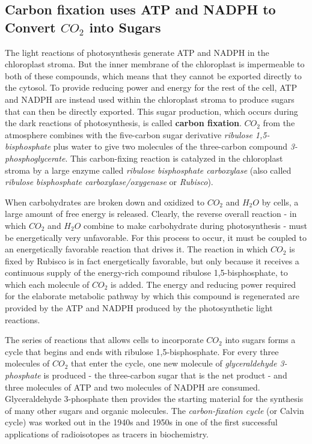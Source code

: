 \subsection{Carbon fixation uses ATP and NADPH to Convert $CO_2$ into Sugars}

The light reactions of photosynthesis generate ATP and NADPH in the
chloroplast stroma. But the inner membrane of the chloroplast is impermeable
to both of these compounds, which means that they cannot be
exported directly to the cytosol. To provide reducing power and energy
for the rest of the cell, ATP and NADPH are instead used within the chloroplast
stroma to produce sugars that can then be directly exported. This
sugar production, which occurs during the dark reactions of photosynthesis,
is called \textbf{carbon fixation}.
$CO_2$ from the atmosphere combines with the five-carbon sugar derivative
\textit{ribulose 1,5-bisphosphate} plus water to give two
molecules of the three-carbon compound \textit{3-phosphoglycerate}.
This carbon-fixing reaction is catalyzed in the chloroplast stroma by a
large enzyme called \textit{ribulose bisphosphate carboxylase} (also called
\textit{ribulose bisphosphate carboxylase/oxygenase} or \textit{Rubisco}).

When carbohydrates are broken down and oxidized to $CO_2$ and $H_{2}O$
by cells, a large amount of free energy is released. Clearly, the reverse
overall reaction - in which $CO_2$ and $H_{2}O$ combine to make carbohydrate
during photosynthesis - must be energetically very unfavorable. For this
process to occur, it must be coupled to an energetically favorable reaction
that drives it. The reaction in which $CO_2$ is fixed by Rubisco is in fact
energetically favorable, but only because it receives a continuous supply
of the energy-rich compound ribulose 1,5-bisphosphate, to which each
molecule of $CO_2$ is added. The energy and reducing
power required for the elaborate metabolic pathway by which this compound
is regenerated are provided by the ATP and NADPH produced by
the photosynthetic light reactions.

The series of reactions that allows cells to incorporate $CO_2$ into sugars
forms a cycle that begins and ends with ribulose 1,5-bisphosphate.
For every three molecules of $CO_2$ that enter the cycle, one
new molecule of \textit{glyceraldehyde 3-phosphate} is produced - the three-carbon
sugar that is the net product - and three molecules of ATP and two
molecules of NADPH are consumed. Glyceraldehyde 3-phosphate then
provides the starting material for the synthesis of many other sugars and
organic molecules. The \textit{carbon-fixation cycle} (or Calvin cycle) was worked
out in the 1940s and 1950s in one of the first successful applications of
radioisotopes as tracers in biochemistry.

